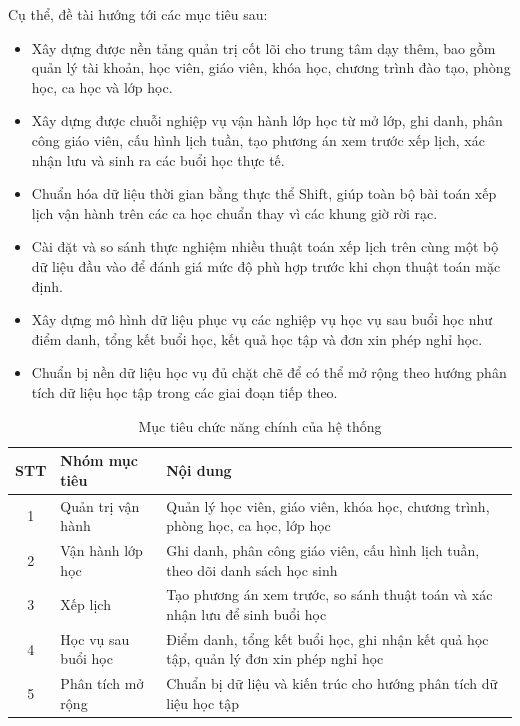 \documentclass[../DoAn.tex]{subfiles}
\begin{document}
Cụ thể, đề tài hướng tới các mục tiêu sau:
\begin{itemize}
    \item Xây dựng được nền tảng quản trị cốt lõi cho trung tâm dạy thêm, bao gồm quản lý tài khoản, học viên, giáo viên, khóa học, chương trình đào tạo, phòng học, ca học và lớp học.
    \item Xây dựng được chuỗi nghiệp vụ vận hành lớp học từ mở lớp, ghi danh, phân công giáo viên, cấu hình lịch tuần, tạo phương án xem trước xếp lịch, xác nhận lưu và sinh ra các buổi học thực tế.
    \item Chuẩn hóa dữ liệu thời gian bằng thực thể Shift, giúp toàn bộ bài toán xếp lịch vận hành trên các ca học chuẩn thay vì các khung giờ rời rạc.
    \item Cài đặt và so sánh thực nghiệm nhiều thuật toán xếp lịch trên cùng một bộ dữ liệu đầu vào để đánh giá mức độ phù hợp trước khi chọn thuật toán mặc định.
    \item Xây dựng mô hình dữ liệu phục vụ các nghiệp vụ học vụ sau buổi học như điểm danh, tổng kết buổi học, kết quả học tập và đơn xin phép nghỉ học.
    \item Chuẩn bị nền dữ liệu học vụ đủ chặt chẽ để có thể mở rộng theo hướng phân tích dữ liệu học tập trong các giai đoạn tiếp theo.
\end{itemize}

\begin{table}[H]
\centering
\caption{Mục tiêu chức năng chính của hệ thống}
\label{table:bang1.1}
\begin{tabular}{|c|l|p{8cm}|}
\hline
\textbf{STT} & \textbf{Nhóm mục tiêu} & \textbf{Nội dung} \\ \hline
1 & Quản trị vận hành & Quản lý học viên, giáo viên, khóa học, chương trình, phòng học, ca học, lớp học \\ \hline
2 & Vận hành lớp học & Ghi danh, phân công giáo viên, cấu hình lịch tuần, theo dõi danh sách học sinh \\ \hline
3 & Xếp lịch & Tạo phương án xem trước, so sánh thuật toán và xác nhận lưu để sinh buổi học \\ \hline
4 & Học vụ sau buổi học & Điểm danh, tổng kết buổi học, ghi nhận kết quả học tập, quản lý đơn xin phép nghỉ học \\ \hline
5 & Phân tích mở rộng & Chuẩn bị dữ liệu và kiến trúc cho hướng phân tích dữ liệu học tập \\ \hline
\end{tabular}
\end{table}
\end{document}
